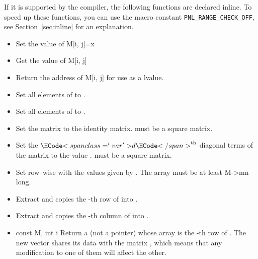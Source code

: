 If it is supported by the compiler, the following functions are declared
inline. To speed up these functions, you can use the macro constant
\texttt{PNL_RANGE_CHECK_OFF}, see Section~\ref{sec:inline} for an explanation. 
\begin{itemize}
\item {}
  \sshortdescribe Set the value of M[i, j]=x  

\item {}
  \sshortdescribe Get the value of M[i, j]  

\item {}
  \sshortdescribe Return the address of M[i, j] for use as a lvalue.

\item {}
  \sshortdescribe Set all elements of  to .
\item {}
  \sshortdescribe Set all elements of  to .
  
\item {}
  \sshortdescribe Set the matrix  to the identity
  matrix.  must be a square matrix.

\item {}
  \sshortdescribe Set the $\var{d}^{\text{th}}$ diagonal terms of the matrix
   to the value .  must be a square matrix.
\item {}
  \sshortdescribe Set  row--wise with the values given by . The
  array  must be at least M->mn long.
\item {}
  \sshortdescribe Extract and copies the -th row of  into
  .

\item {}
  \sshortdescribe Extract and copies the -th column of  into .
  
\item {}
  {const \PnlMat \ptr M, int i}
  \sshortdescribe Return a \PnlVect (not a pointer) whose array is
  the -th row of . The new vector shares its data with the
  matrix , which means that any modification to one of them will affect
  the other.
  

\end{itemize}
